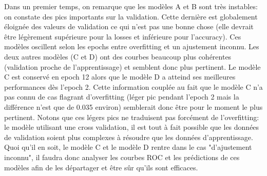 \documentclass[a4paper,12pt]{report}
\begin{document}
      \bigbreak
      Dans un premier temps, on remarque que les modèles A et B sont très instables: on constate des pics importants sur la validation. Cette dernière est globalement éloignée des valeurs de validation ce qui n'est pas une bonne chose (elle devrait être légèrement supérieure pour la losses et inférieure pour l'accuracy). Ces modèles oscillent selon les epochs entre overfitting et un ajustement inconnu.
      \medbreak
      Les deux autres modèles (C et D) ont des courbes beaucoup plus cohérentes (validation proche de l'apprentissage) et semblent donc plus pertinent. Le modèle C est conservé en epoch 12 alors que le modèle D a atteind ses meilleures performances dès l'epoch 2. Cette information couplée au fait que le modèle C n'a pas connu de cas flagrant d'overfitting (léger pic pendant l'epoch 2 mais la différence n'est que de 0.035 environ) semblerait donc être pour le moment le plus pertinent.
      \smallbreak
      Notons que ces légers pics ne traduisent pas forcément de l'overfitting: le modèle utilisant une cross validation, il est tout à fait possible que les données de validation soient plus complexes à résoudre que les données d'apprentissage.
      \medbreak
      Quoi qu'il en soit, le modèle C et le modèle D rentre dans le cas "d'ajustement inconnu", il faudra donc analyser les courbes ROC et les prédictions de ces modèles afin de les départager et être sûr qu'ils sont efficaces.
\end{document}
